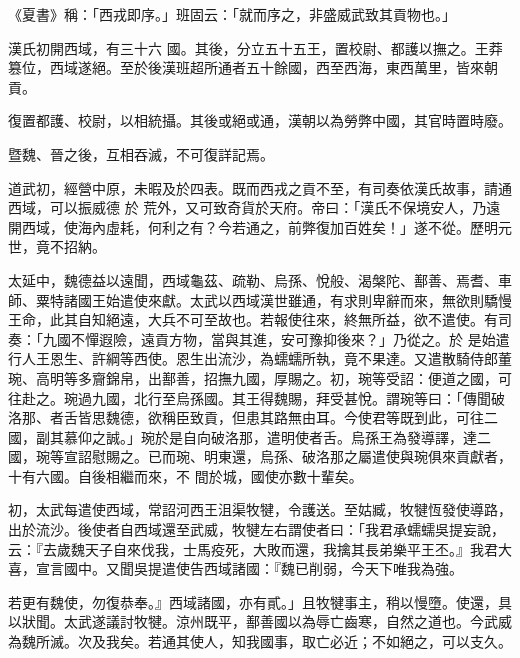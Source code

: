 
\begin{pinyinscope}

 《夏書》稱：「西戎即序。」班固云：「就而序之，非盛威武致其貢物也。」



 漢氏初開西域，有三十六
 國。其後，分立五十五王，置校尉、都護以撫之。王莽篡位，西域遂絕。至於後漢班超所通者五十餘國，西至西海，東西萬里，皆來朝貢。



 復置都護、校尉，以相統攝。其後或絕或通，漢朝以為勞弊中國，其官時置時廢。



 暨魏、晉之後，互相吞滅，不可復詳記焉。



 道武初，經營中原，未暇及於四表。既而西戎之貢不至，有司奏依漢氏故事，請通西域，可以振威德
 於
 荒外，又可致奇貨於天府。帝曰：「漢氏不保境安人，乃遠開西域，使海內虛耗，何利之有？今若通之，前弊復加百姓矣！」遂不從。歷明元世，竟不招納。



 太延中，魏德益以遠聞，西域龜茲、疏勒、烏孫、悅般、渴槃陀、鄯善、焉耆、車師、粟特諸國王始遣使來獻。太武以西域漢世雖通，有求則卑辭而來，無欲則驕慢王命，此其自知絕遠，大兵不可至故也。若報使往來，終無所益，欲不遣使。有司奏：「九國不憚遐險，遠貢方物，當與其進，安可豫抑後來？」乃從之。於
 是始遣行人王恩生、許綱等西使。恩生出流沙，為蠕蠕所執，竟不果達。又遣散騎侍郎董琬、高明等多齎錦帛，出鄯善，招撫九國，厚賜之。初，琬等受詔：便道之國，可往赴之。琬過九國，北行至烏孫國。其王得魏賜，拜受甚悅。謂琬等曰：「傳聞破洛那、者舌皆思魏德，欲稱臣致貢，但患其路無由耳。今使君等既到此，可往二國，副其慕仰之誠。」琬於是自向破洛那，遣明使者舌。烏孫王為發導譯，達二國，琬等宣詔慰賜之。已而琬、明東還，烏孫、破洛那之屬遣使與琬俱來貢獻者，十有六國。自後相繼而來，不
 間於城，國使亦數十輩矣。



 初，太武每遣使西域，常詔河西王沮渠牧犍，令護送。至姑臧，牧犍恆發使導路，出於流沙。後使者自西域還至武威，牧犍左右謂使者曰：「我君承蠕蠕吳提妄說，云：『去歲魏天子自來伐我，士馬疫死，大敗而還，我擒其長弟樂平王丕。』我君大喜，宣言國中。又聞吳提遣使告西域諸國：『魏已削弱，今天下唯我為強。



 若更有魏使，勿復恭奉。』西域諸國，亦有貳。」且牧犍事主，稍以慢墮。使還，具以狀聞。太武遂議討牧犍。涼州既平，鄯善國以為辱亡齒寒，自然之道也。今武威為魏所滅。次及我矣。若通其使人，知我國事，取亡必近；不如絕之，可以支久。




\end{pinyinscope}
